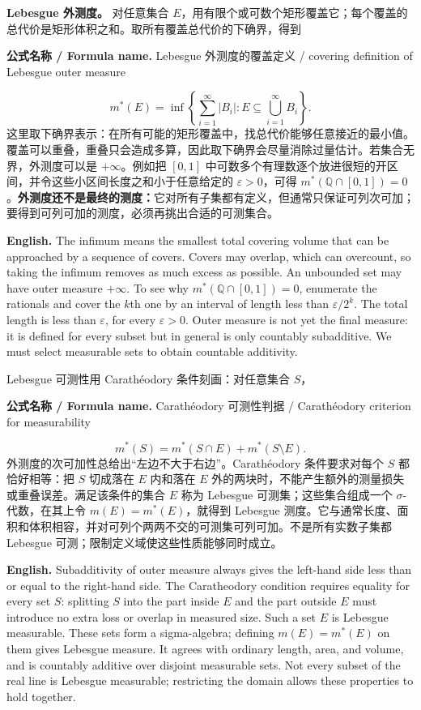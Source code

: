 \documentclass[UTF8,11pt,a4paper]{ctexart}
\newcommand{\EN}[1]{\par\noindent\textbf{English.} #1\par}
\newcommand{\FORMULA}[2]{\par\noindent\textbf{公式名称 / Formula name.} #1 / #2\par}
\begin{document}
\noindent\textbf{Lebesgue 外测度。} 对任意集合 $E$，用有限个或可数个矩形覆盖它；每个覆盖的总代价是矩形体积之和。取所有覆盖总代价的下确界，得到
\FORMULA{Lebesgue 外测度的覆盖定义}{covering definition of Lebesgue outer measure}
\[
m^*(E)=\inf\left\{\sum_{i=1}^{\infty}|B_i|:
E\subseteq\bigcup_{i=1}^{\infty}B_i\right\}.
\]
这里取下确界表示：在所有可能的矩形覆盖中，找总代价能够任意接近的最小值。覆盖可以重叠，重叠只会造成多算，因此取下确界会尽量消除过量估计。若集合无界，外测度可以是 $+\infty$。例如把 $[0,1]$ 中可数多个有理数逐个放进很短的开区间，并令这些小区间长度之和小于任意给定的 $\varepsilon>0$，可得 $m^*(\mathbb Q\cap[0,1])=0$。\textbf{外测度还不是最终的测度：}它对所有子集都有定义，但通常只保证可列次可加；要得到可列可加的测度，必须再挑出合适的可测集合。
\EN{The infimum means the smallest total covering volume that can be approached by a sequence of covers. Covers may overlap, which can overcount, so taking the infimum removes as much excess as possible. An unbounded set may have outer measure $+\infty$. To see why $m^*(\mathbb Q\cap[0,1])=0$, enumerate the rationals and cover the $k$th one by an interval of length less than $\varepsilon/2^k$. The total length is less than $\varepsilon$, for every $\varepsilon>0$. Outer measure is not yet the final measure: it is defined for every subset but in general is only countably subadditive. We must select measurable sets to obtain countable additivity.}

\noindent Lebesgue 可测性用 Carath\'eodory 条件刻画：对任意集合 $S$，
\FORMULA{Carathéodory 可测性判据}{Carathéodory criterion for measurability}
\[
m^*(S)=m^*(S\cap E)+m^*(S\setminus E).
\]
外测度的次可加性总给出“左边不大于右边”。Carath\'eodory 条件要求对每个 $S$ 都恰好相等：把 $S$ 切成落在 $E$ 内和落在 $E$ 外的两块时，不能产生额外的测量损失或重叠误差。满足该条件的集合 $E$ 称为 Lebesgue 可测集；这些集合组成一个 $\sigma$-代数，在其上令 $m(E)=m^*(E)$，就得到 Lebesgue 测度。它与通常长度、面积和体积相容，并对可列个两两不交的可测集可列可加。不是所有实数子集都 Lebesgue 可测；限制定义域使这些性质能够同时成立。
\EN{Subadditivity of outer measure always gives the left-hand side less than or equal to the right-hand side. The Caratheodory condition requires equality for every set $S$: splitting $S$ into the part inside $E$ and the part outside $E$ must introduce no extra loss or overlap in measured size. Such a set $E$ is Lebesgue measurable. These sets form a sigma-algebra; defining $m(E)=m^*(E)$ on them gives Lebesgue measure. It agrees with ordinary length, area, and volume, and is countably additive over disjoint measurable sets. Not every subset of the real line is Lebesgue measurable; restricting the domain allows these properties to hold together.}
\end{document}

